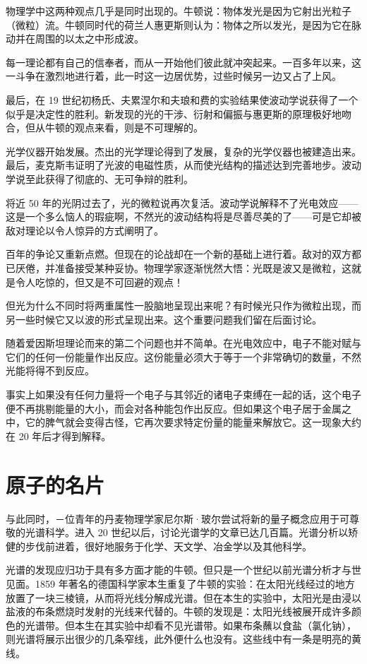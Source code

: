 物理学中这两种观点几乎是同时出现的。牛顿说：物体发光是因为它射出光粒子（微粒）流。牛顿同时代的荷兰人惠更斯则认为：物体之所以发光，是因为它在脉动并在周围的以太之中形成波。

每一理论都有自己的信奉者，而从一开始他们彼此就冲突起来。一百多年以来，这一斗争在激烈地进行着，此一时这一边居优势，过些时候另一边又占了上风。

最后，在 19 世纪初杨氏、夫累涅尔和夫琅和费的实验结果使波动学说获得了一个似乎是决定性的胜利。新发现的光的干涉、衍射和偏振与惠更斯的原理极好地吻合，但从牛顿的观点来看，则是不可理解的。

光学仪器开始发展。杰出的光学理论得到了发展，复杂的光学仪器也被建造出来。最后，麦克斯韦证明了光波的电磁性质，从而使光结构的描述达到完善地步。波动学说至此获得了彻底的、无可争辩的胜利。

将近 50 年的光阴过去了，光的微粒说再次复活。波动学说解释不了光电效应——这是一个多么恼人的瑕疵啊，不然光的波动结构将是尽善尽美的了——可是它却被敌对理论以令人惊异的方式阐明了。

百年的争论又重新点燃。但现在的论战却在一个新的基础上进行着。敌对的双方都已厌倦，并准备接受某种妥协。物理学家逐渐恍然大悟：光既是波又是微粒，这就是令人吃惊的，但又是不可回避的观点！

但光为什么不同时将两重属性一股脑地呈现出来呢？有时候光只作为微粒出现，而另一些时候它又以波的形式呈现出来。这个重要问题我们留在后面讨论。

随着爱因斯坦理论而来的第二个问题也并不简单。在光电效应中，电子不能对赋与它们的任何一份能量作出反应。这份能量必须大于等于一个非常确切的数量，不然光能将得不到反应。

事实上如果没有任何力量将一个电子与其邻近的诸电子束缚在一起的话，这个电子便不再挑剔能量的大小，而会对各种能包作出反应。但如果这个电子居于金属之中，它的脾气就会变得古怪，它再次要求特定份量的能量来解放它。这一现象大约在 20 年后才得到解释。

\section{原子的名片}

与此同时，－位青年的丹麦物理学家尼尔斯·玻尔尝试将新的量子概念应用于可尊敬的光谱科学。进入 20 世纪以后，讨论光谱学的文章已达几百篇。光谱分析以矫健的步伐前进着，很好地服务于化学、天文学、冶金学以及其他科学。

光谱的发现应归功于具有多方面才能的牛顿。但只是一个世纪以前光谱分析才与世见面。1859 年著名的德国科学家本生重复了牛顿的实验：在太阳光线经过的地方放置了一块三棱镜，从而将光线分解成光谱。但在本生的实验中，太阳光是由浸以盐液的布条燃烧时发射的光线来代替的。牛顿的发现是：太阳光线被展开成许多颜色的光谱带。但本生在其实验中却看不见光谱带。如果布条蘸以食盐（氯化钠），则光谱将展示出很少的几条窄线，此外便什么也没有。这些线中有一条是明亮的黄线。

